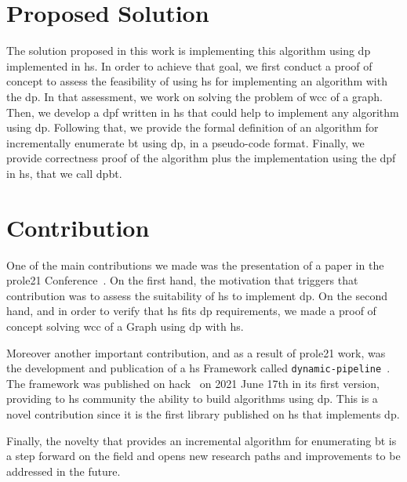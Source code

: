 \section{Proposed Solution}
The solution proposed in this work is implementing this algorithm using \acrfull{dp} implemented in \acrfull{hs}.
In order to achieve that goal, we first conduct a proof of concept to assess the feasibility of using \acrshort{hs} for implementing an algorithm with the \acrshort{dp}.
In that assessment, we work on solving the problem of \acrfull{wcc} of a graph. Then, we develop a \acrlong{dpf} written in \acrlong{hs} that could help to implement any algorithm using \acrshort{dp}.
Following that, we provide the formal definition of an algorithm for incrementally enumerate \acrshort{bt} using \acrshort{dp}, in a pseudo-code format. 
Finally, we provide correctness proof of the algorithm plus the implementation using the \acrshort{dpf} in \acrshort{hs}, that we call \acrfull{dpbt}.

\section{Contribution}\label{sec:contrib}
One of the main contributions we made was the presentation of a paper in the \acrfull{prole21} Conference~\cite{prole21}. 
On the first hand, the motivation that triggers that contribution was to assess the suitability of \acrshort{hs} to implement \acrshort{dp}. 
On the second hand, and in order to verify that \acrshort{hs} fits \acrshort{dp} requirements, we made a proof of concept solving \acrfull{wcc} of a Graph 
using \acrshort{dp} with \acrshort{hs}.

Moreover another important contribution, and as a result of \acrshort{prole21} work, was the development and publication of a \acrshort{hs} Framework 
called \texttt{dynamic-pipeline}~\cite{dynamic-pipeline}. The framework was published on \acrfull{hack}~\cite{hackage} on 2021 June 17th in its first version,
providing to \acrshort{hs} community the ability to build algorithms using \acrshort{dp}. This is a novel contribution since it is the first library published on \acrshort{hs}
that implements \acrshort{dp}.

Finally, the novelty that provides an incremental algorithm for enumerating \acrshort{bt} is a step forward on the field and opens new research paths and improvements 
to be addressed in the future. 

